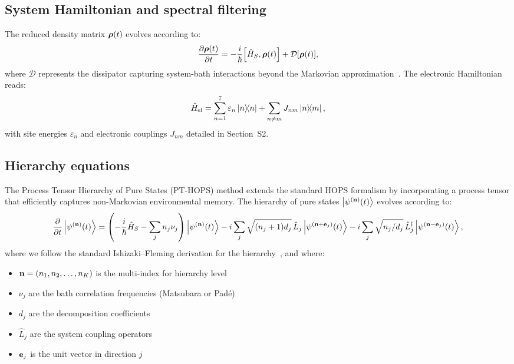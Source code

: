 \documentclass[11pt,a4paper]{article}
\begin{document}
\subsection{System Hamiltonian and spectral filtering}
\label{sec:SI_pulse}

The reduced density matrix $\vb*{\rho}(t)$ evolves according to:
\begin{equation}
\pdv{\vb*{\rho}(t)}{t} = -\frac{i}{\hbar}\comm{\hat{H}_S}{\vb*{\rho}(t)} + \mathcal{D}[\vb*{\rho}(t)],
\label{eq:SI_master_eq}
\end{equation}
where $\mathcal{D}$ represents the dissipator capturing system-bath interactions beyond the Markovian approximation~\cite{Tanimura1989}. The electronic Hamiltonian reads:
\begin{equation}
\hat{H}_{\mathrm{el}} = \sum_{n=1}^{7} \varepsilon_n \dyad{n} + \sum_{n \neq m} J_{nm} \dyad{n}{m},
\label{eq:SI_excitonic_hamiltonian}
\end{equation}
with site energies $\varepsilon_n$ and electronic couplings $J_{nm}$ detailed in Section~S2.

\subsection{Hierarchy equations}

The Process Tensor Hierarchy of Pure States (PT-HOPS) method extends the standard HOPS formalism by incorporating a process tensor that efficiently captures non-Markovian environmental memory. The hierarchy of pure states $\ket{\psi^{(\vb{n})}(t)}$ evolves according to:
\begin{equation}
\pdv{t}\ket{\psi^{(\vb{n})}(t)} = \left(-\frac{i}{\hbar}\hat{H}_S - \sum_{j} n_j \nu_j\right)\ket{\psi^{(\vb{n})}(t)} 
- i\sum_{j} \sqrt{(n_j+1)d_j} \, \hat{L}_j \ket{\psi^{(\vb{n}+\vb{e}_j)}(t)} 
- i\sum_{j} \sqrt{n_j/d_j} \, \hat{L}_j^\dagger \ket{\psi^{(\vb{n}-\vb{e}_j)}(t)},
\label{eq:SI_hops}
\end{equation}
where we follow the standard Ishizaki--Fleming derivation for the hierarchy~\cite{Ishizaki2009a,Strathearn2018}, and where:
\begin{itemize}
\item $\vb{n} = (n_1, n_2, \ldots, n_K)$ is the multi-index for hierarchy level
\item $\nu_j$ are the bath correlation frequencies (Matsubara or Padé)
\item $d_j$ are the decomposition coefficients
\item $\hat{L}_j$ are the system coupling operators
\item $\vb{e}_j$ is the unit vector in direction $j$
\end{itemize}
\end{document}
